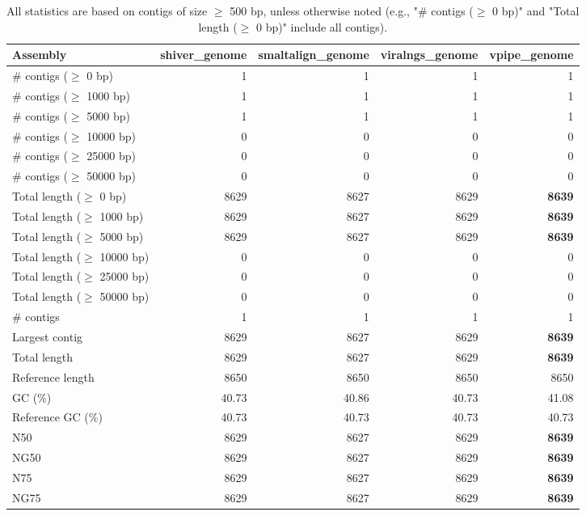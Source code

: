 \documentclass[12pt,a4paper]{article}
\begin{document}
\begin{table}[ht]
\begin{center}
\caption{All statistics are based on contigs of size $\geq$ 500 bp, unless otherwise noted (e.g., "\# contigs ($\geq$ 0 bp)" and "Total length ($\geq$ 0 bp)" include all contigs).}
\begin{tabular}{|l*{4}{|r}|}
\hline
Assembly & shiver\_genome & smaltalign\_genome & viralngs\_genome & vpipe\_genome \\ \hline
\# contigs ($\geq$ 0 bp) & 1 & 1 & 1 & 1 \\ \hline
\# contigs ($\geq$ 1000 bp) & 1 & 1 & 1 & 1 \\ \hline
\# contigs ($\geq$ 5000 bp) & 1 & 1 & 1 & 1 \\ \hline
\# contigs ($\geq$ 10000 bp) & 0 & 0 & 0 & 0 \\ \hline
\# contigs ($\geq$ 25000 bp) & 0 & 0 & 0 & 0 \\ \hline
\# contigs ($\geq$ 50000 bp) & 0 & 0 & 0 & 0 \\ \hline
Total length ($\geq$ 0 bp) & 8629 & 8627 & 8629 & {\bf 8639} \\ \hline
Total length ($\geq$ 1000 bp) & 8629 & 8627 & 8629 & {\bf 8639} \\ \hline
Total length ($\geq$ 5000 bp) & 8629 & 8627 & 8629 & {\bf 8639} \\ \hline
Total length ($\geq$ 10000 bp) & 0 & 0 & 0 & 0 \\ \hline
Total length ($\geq$ 25000 bp) & 0 & 0 & 0 & 0 \\ \hline
Total length ($\geq$ 50000 bp) & 0 & 0 & 0 & 0 \\ \hline
\# contigs & 1 & 1 & 1 & 1 \\ \hline
Largest contig & 8629 & 8627 & 8629 & {\bf 8639} \\ \hline
Total length & 8629 & 8627 & 8629 & {\bf 8639} \\ \hline
Reference length & 8650 & 8650 & 8650 & 8650 \\ \hline
GC (\%) & 40.73 & 40.86 & 40.73 & 41.08 \\ \hline
Reference GC (\%) & 40.73 & 40.73 & 40.73 & 40.73 \\ \hline
N50 & 8629 & 8627 & 8629 & {\bf 8639} \\ \hline
NG50 & 8629 & 8627 & 8629 & {\bf 8639} \\ \hline
N75 & 8629 & 8627 & 8629 & {\bf 8639} \\ \hline
NG75 & 8629 & 8627 & 8629 & {\bf 8639} \\ \hline

\end{tabular}
\end{center}
\end{table}
\end{document}
